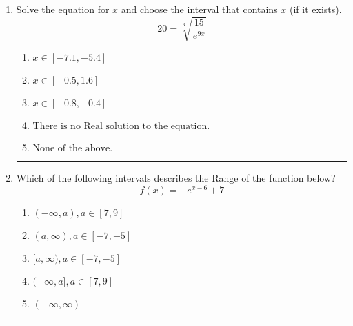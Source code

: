 \documentclass[14pt]{extbook}
\newcommand{\litem}[1]{\item#1\hspace*{-1cm}\rule{\textwidth}{0.4pt}}
\begin{document}
\begin{enumerate}
{\begin{enumerate}[label=\Alph*.]
\end{enumerate} }
\litem{
 Solve the equation for $x$ and choose the interval that contains $x$ (if it exists).\[  20 = \sqrt[3]{\frac{15}{e^{9x}}} \]\begin{enumerate}[label=\Alph*.]
\item \( x \in [-7.1, -5.4] \)
\item \( x \in [-0.5, 1.6] \)
\item \( x \in [-0.8, -0.4] \)
\item \( \text{There is no Real solution to the equation.} \)
\item \( \text{None of the above.} \)

\end{enumerate} }
\litem{
Which of the following intervals describes the Range of the function below?\[ f(x) = -e^{x-6}+7 \]\begin{enumerate}[label=\Alph*.]
\item \( (-\infty, a), a \in [7, 9] \)
\item \( (a, \infty), a \in [-7, -5] \)
\item \( [a, \infty), a \in [-7, -5] \)
\item \( (-\infty, a], a \in [7, 9] \)
\item \( (-\infty, \infty) \)

\end{enumerate} }
\end{enumerate}
\end{document}
